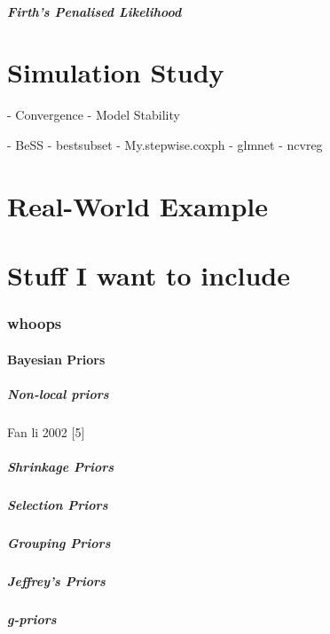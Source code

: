 \subsubsection{Firth's Penalised Likelihood}

\part{Simulation Study}
- Convergence
- Model Stability


- BeSS
- bestsubset
- My.stepwise.coxph
- glmnet
- ncvreg

\iffalse

\part{Real-World Example}

\part{Stuff I want to include}

\section{whoops}
\subsection{Bayesian Priors}
\subsubsection{Non-local priors}
Fan li 2002 [5]
\subsubsection{Shrinkage Priors}
\subsubsection{Selection Priors}
\subsubsection{Grouping Priors}
\subsubsection{Jeffrey's Priors}
\subsubsection{g-priors}
